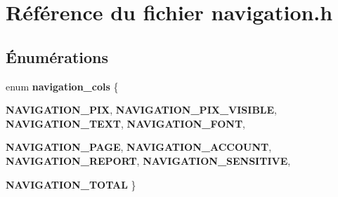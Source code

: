 \section{Référence du fichier navigation.h}
\label{navigation_8h}
\subsection*{Énumérations}
\begin{DoxyCompactItemize}
\item 
enum {\bf navigation\_\-cols} \{ \par
{\bf NAVIGATION\_\-PIX}, 
{\bf NAVIGATION\_\-PIX\_\-VISIBLE}, 
{\bf NAVIGATION\_\-TEXT}, 
{\bf NAVIGATION\_\-FONT}, 
\par
{\bf NAVIGATION\_\-PAGE}, 
{\bf NAVIGATION\_\-ACCOUNT}, 
{\bf NAVIGATION\_\-REPORT}, 
{\bf NAVIGATION\_\-SENSITIVE}, 
\par
{\bf NAVIGATION\_\-TOTAL}
 \}
\end{DoxyCompactItemize}
